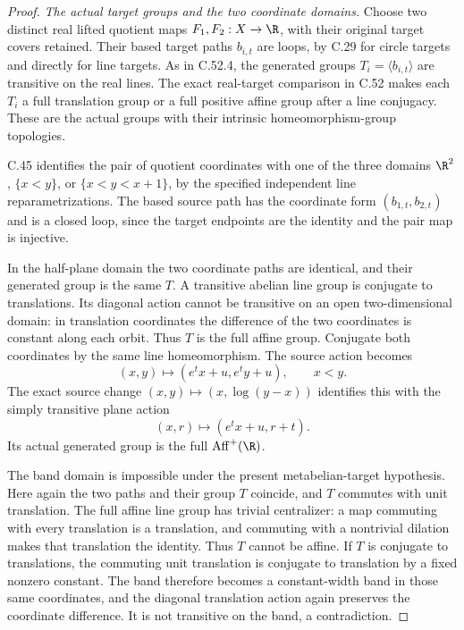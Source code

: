 \begin{proof}
\emph{The actual target groups and the two coordinate domains.}
Choose two distinct real lifted quotient maps
$F_1,F_2:X\to\R$, with their original target covers
retained. Their based target paths $b_{i,t}$ are
loops, by C.29 for circle targets and directly
for line targets. As in C.52.4, the generated
groups $T_i=\langle b_{i,t}\rangle$ are transitive
on the real lines. The exact real-target
comparison in C.52 makes each $T_i$ a full
translation group or a full positive affine
group after a line conjugacy. These are the
actual groups with their intrinsic
homeomorphism-group topologies.

C.45 identifies the pair of quotient coordinates
with one of the three domains
$\R^2$, $\{x<y\}$, or $\{x<y<x+1\}$, by the
specified independent line reparametrizations.
The based source path has the coordinate form
$(b_{1,t},b_{2,t})$ and is a closed loop, since
the target endpoints are the identity and the
pair map is injective.

In the half-plane domain the two coordinate
paths are identical, and their generated group
is the same $T$. A transitive abelian line
group is conjugate to translations. Its
diagonal action cannot be transitive on an
open two-dimensional domain: in translation
coordinates the difference of the two
coordinates is constant along each orbit.
Thus $T$ is the full affine group.
Conjugate both coordinates by the same line
homeomorphism. The source action becomes
\[
          (x,y)\longmapsto(e^t x+u,e^t y+u),
                         \qquad x<y.                  \tag{C.54.2}
\]
The exact source change
$(x,y)\mapsto(x,\log(y-x))$ identifies this with
the simply transitive plane action
\[
                    (x,r)\longmapsto(e^t x+u,r+t).
                                                               \tag{C.54.3}
\]
Its actual generated group is the full
$\operatorname{Aff}^+(\R)$.

The band domain is impossible under the
present metabelian-target hypothesis.
Here again the two paths and their group $T$
coincide, and $T$ commutes with unit translation.
The full affine line group has trivial
centralizer: a map commuting with every
translation is a translation, and commuting
with a nontrivial dilation makes that
translation the identity.
Thus $T$ cannot be affine.
If $T$ is conjugate to translations, the
commuting unit translation is conjugate to
translation by a fixed nonzero constant.
The band therefore becomes a constant-width
band in those same coordinates, and the
diagonal translation action again preserves
the coordinate difference. It is not
transitive on the band, a contradiction.


\end{proof}
